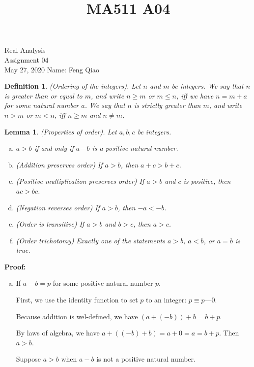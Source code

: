 \documentclass[12pt]{article}
\title{MA511 A04}
\newtheorem{lem}{Lemma}%
\newtheorem{defn}{Definition}
\begin{document}
\begin{flushleft}
{\sc \Large Real Analysis} \\
\medskip
Assignment 04\\
May 27, 2020
\hfill Name: Feng Qiao\\

\setdefaultleftmargin{0pt}{}{}{}{}{}

\begin{defn}
(Ordering of the integers). Let \(n\) and \(m\) be integers. We say that \(n\) is greater than or equal to \(m\), and write \(n \geq m\) or \(m \leq n\),  iff we have \(n = m + a\) for some natural number \(a\). We say that \(n\) is strictly greater than \(m\), and write \(n > m\) or \(m < n\), iff \(n \geq m\) and \(n \neq m\).
\end{defn}

\begin{lem}
(Properties of order). Let \(a, b, c\) be integers.
\begin{enumerate}[(a)]
  \item \(a > b\) if and only if \(a\)---\(b\) is a positive natural number.
    \item (Addition preserves order) If \(a > b\), then \(a + c > b + c\).
    \item (Positive multiplication preserves order) If \(a > b\) and \(c\) is positive, then \(ac > bc\).
    \item (Negation reverses order) If \(a > b\), then \(-a < -b\).
    \item (Order is transitive) If \(a > b\) and \(b > c\), then \(a > c\).
    \item (Order trichotomy) Exactly one of the statements \(a > b\), \(a < b\), or \(a = b\) is true.
\end{enumerate}
\end{lem}

\textbf{Proof:}

\begin{enumerate}[(a)]
  \item If \(a-b=p\) for some positive natural number \(p\).

    First, we use the identity function to set \(p\) to an integer: \(p \equiv p\)---0.

    Because addition is wel-defined, we have \((a + (-b)) + b =  b + p\).

    By laws of algebra, we have \(a + ((-b)+b)=a + 0 =a=b+p\). Then \(a>b\).

    Suppose \(a>b\) when \(a-b\) is not a positive natural number.
\end{enumerate}

\end{flushleft}
\end{document}
